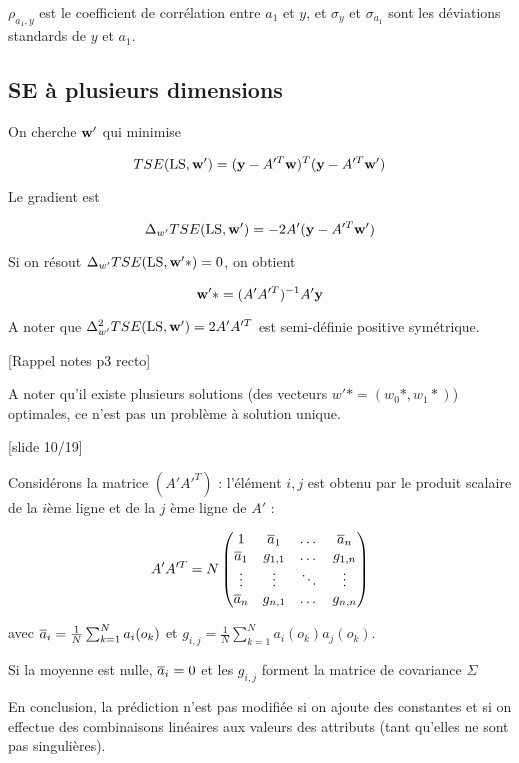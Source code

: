 		$\rho_{a_1, y}$ est le coefficient de corrélation entre $a_1$ et $y$, et $\sigma_y$ et $\sigma_{a_1}$ sont les déviations standards de $y$ et $a_1$.
		
		\subsection{SE à plusieurs dimensions}
		
		On cherche $\textbf{w}'$ qui minimise
		
		$$TSE(\text{LS}, \textbf{w}') = (\textbf{y} - A'^T\textbf{w})^T(\textbf{y} - A'^T\textbf{w}')$$
		
		Le gradient est
		
		$$\Delta_{w'} TSE(\text{LS}, \textbf{w}') = -2 A' (\textbf{y} - A'^T\textbf{w}')$$
		
		Si on résout $\Delta_{w'} TSE(\text{LS}, \textbf{w}'*) = 0$, on obtient
		
		$$\textbf{w}'* = (A'A'^T)^{-1}A'\textbf{y}$$
		
		A noter que $\Delta^2_{w'} TSE(\text{LS}, \textbf{w}') = 2A'A'^T$ est semi-définie positive symétrique.
		
		[Rappel notes p3 recto]
		
		A noter qu'il existe plusieurs solutions (des vecteurs $w'* = (w_0*, w_1*)$) optimales, ce n'est pas un problème à solution unique.
		
		[slide 10/19]
		
		Considérons la matrice $(A'A'^T)$ : l'élément $i, j$ est obtenu par le produit scalaire de la $i$ème ligne et de la $j$ ème ligne de $A'$ :
		
		$$A'A'^T = N \begin{pmatrix}
		1 &  \overline{a}_1 & \dots & \overline{a}_n \\ 
		\overline{a}_1 & g_{1,1} & \dots & g_{1, n} \\
		\vdots & \vdots & \ddots & \vdots \\
		\overline{a}_n & g_{n, 1} & \dots & g_{n, n}
		\end{pmatrix} $$
		
		avec $\overline{a}_i = \frac{1}{N} \sum_{k = 1}^N a_i(o_k)$ et $g_{i, j} = \frac{1}{N} \sum_{k = 1}^N a_i(o_k)a_j(o_k)$.
		
		Si la moyenne est nulle, $\overline{a}_i = 0$ et les $g_{i, j}$ forment la matrice de covariance $\Sigma$
		
		
		En conclusion, la prédiction n'est pas modifiée si on ajoute des constantes et si on effectue des combinaisons linéaires aux valeurs des attributs (tant qu'elles ne sont pas singulières).
		
